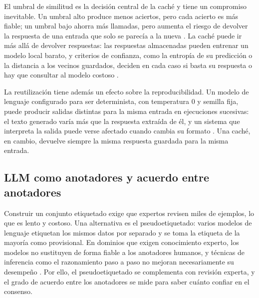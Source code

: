 El umbral de similitud es la decisión central de la caché y tiene un compromiso inevitable. Un umbral alto produce menos aciertos, pero cada acierto es más fiable; un umbral bajo ahorra más llamadas, pero aumenta el riesgo de devolver la respuesta de una entrada que solo se parecía a la nueva \cite{ak2025_siu}. La caché puede ir más allá de devolver respuestas: las respuestas almacenadas pueden entrenar un modelo local barato, y criterios de confianza, como la entropía de su predicción o la distancia a los vecinos guardados, deciden en cada caso si basta su respuesta o hay que consultar al modelo costoso \cite{stogiannidis2023_cache}.

La reutilización tiene además un efecto sobre la reproducibilidad. Un modelo de lenguaje configurado para ser determinista, con temperatura 0 y semilla fija, puede producir salidas distintas para la misma entrada en ejecuciones sucesivas: el texto generado varía más que la respuesta extraída de él, y un sistema que interpreta la salida puede verse afectado cuando cambia su formato \cite{atil2025_nondeterminism}. Una caché, en cambio, devuelve siempre la misma respuesta guardada para la misma entrada.

\subsection{LLM como anotadores y acuerdo entre anotadores}\label{sec:mt_anotacion}

Construir un conjunto etiquetado exige que expertos revisen miles de ejemplos, lo que es lento y costoso. Una alternativa es el pseudoetiquetado: varios modelos de lenguaje etiquetan los mismos datos por separado y se toma la etiqueta de la mayoría como provisional. En dominios que exigen conocimiento experto, los modelos no sustituyen de forma fiable a los anotadores humanos, y técnicas de inferencia como el razonamiento paso a paso no mejoran necesariamente su desempeño \cite{tseng2025_expert_annotators}. Por ello, el pseudoetiquetado se complementa con revisión experta, y el grado de acuerdo entre los anotadores se mide para saber cuánto confiar en el consenso.

